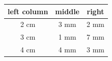 \documentclass[]{article}
\begin{document}
\begin{tabular}{ccc}
	left column & middle & right \\ \hline
	2 cm	    & 3 mm   &  2 mm \\
	3 cm	    & 1 mm   &  7 mm \\
	4 cm        & 4 mm   &  3 mm 
\end{tabular}
\end{document}
